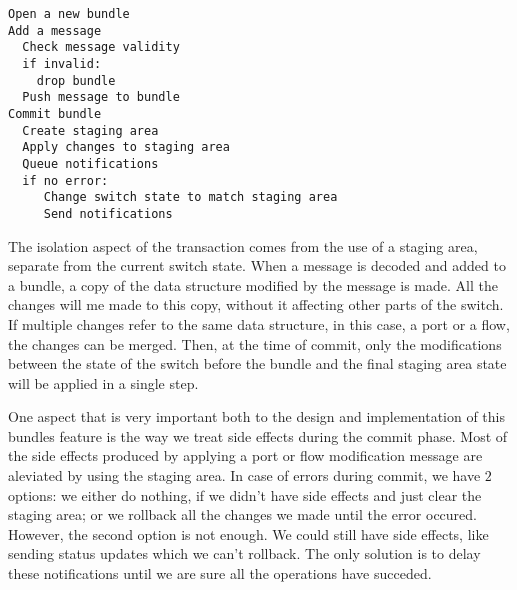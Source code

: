 \pagebreak
\begin{lstlisting}[caption={Basic Commit Algorithm}, label=code:alg]
Open a new bundle
Add a message
  Check message validity
  if invalid:
    drop bundle
  Push message to bundle
Commit bundle
  Create staging area
  Apply changes to staging area
  Queue notifications
  if no error:
     Change switch state to match staging area
     Send notifications
\end{lstlisting}

The isolation aspect of the transaction comes from the use of a staging area, separate from the current switch state.
When a message is decoded and added to a bundle, a copy of the data structure modified by the message is made.
All the changes will me made to this copy, without it affecting other parts of the switch. If multiple changes refer to
the same data structure, in this case, a port or a flow, the changes can be merged. Then, at the time of commit, only
the modifications between the state of the switch before the bundle and the final staging area state will be applied
in a single step.

One aspect that is very important both to the design and implementation of this bundles feature is the way we
treat side effects during the commit phase. Most of the side effects produced by applying a port or flow modification
message are aleviated by using the staging area. In case of errors during commit, we have $2$ options: we either do
nothing, if we didn't have side effects and just clear the staging area; or we rollback all the changes we made until
the error occured. However, the second option is not enough. We could still have side effects, like sending status updates
which we can't rollback. The only solution is to delay these notifications until we are sure all the operations have
succeded.




